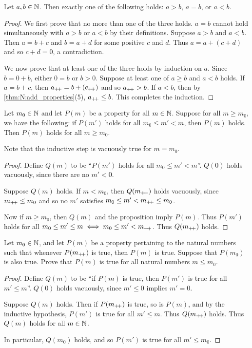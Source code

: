 \begin{proposition}[Trichotomy] \label{thm:trichotomy}
    Let $a, b \in \mathbb{N}$.
    Then exactly one of the following holds: $a > b$, $a = b$, or $a < b$.
\end{proposition}
\begin{proof}
    We first prove that no more than one of the three holds.
    $a = b$ cannot hold simultaneously with $a > b$ or $a < b$ by their
    definitions.
    Suppose $a > b$ and $a < b$.
    Then $a = b + c$ and $b = a + d$ for some positive $c$ and $d$.
    Thus $a = a + (c + d)$ and so $c + d = 0$, a contradiction.

    We now prove that at least one of the three holds by induction on $a$.
    Since $b = 0 + b$, either $0 = b$ or $b > 0$.
    Suppose at least one of $a \ge b$ and $a < b$ holds.
    If $a = b + c$, then $a_{+\!+} = b + (c_{+\!+})$ and so $a_{+\!+} > b$.
    If $a < b$, then by \cref{thm:N:add_properties}(5), $a_{+\!+} \le b$.
    This completes the induction.
\end{proof}

\begin{proposition*} \label{thm:strong_induction}
    Let $m_0 \in \mathbb{N}$ and let $P(m)$ be a property for all $m \in \mathbb{N}$.
    Suppose for all $m \ge m_0$, we have the following:
    if $P(m')$ holds for all $m_0 \le m' < m$, then $P(m)$ holds.
    Then $P(m)$ holds for all $m \ge m_0$.
\end{proposition*}
Note that the inductive step is vacuously true for $m = m_0$.
\begin{proof}
    Define $Q(m)$ to be ``$P(m')$ holds for all $m_0 \le m' < m$''.
    $Q(0)$ holds vacuously, since there are no $m' < 0$.

    Suppose $Q(m)$ holds.
    If $m < m_0$, then $Q(m_{+\!+})$ holds vacuously, since $m_{+\!+} \le m_0$ and so
    no $m'$ satisfies $m_0 \le m' < m_{+\!+} \le m_0$.

    Now if $m \ge m_0$, then $Q(m)$ and the proposition imply $P(m)$.
    Thus $P(m')$ holds for all $m_0 \le m' \le m \iff m_0 \le m' < m_{+\!+}$.
    Thus $Q(m_{+\!+})$ holds.
\end{proof}

\begin{exercise*} \label{prb:back_induction}
    Let $m_0 \in \mathbb{N}$, and let $P(m)$ be a property pertaining to the natural
    numbers such that whenever $P(m_{+\!+})$ is true, then $P(m)$ is true.
    Suppose that $P(m_0)$ is also true.
    Prove that $P(m)$ is true for all natural numbers $m \le m_0$.
\end{exercise*}
\begin{proof}
    Define $Q(m)$ to be ``if $P(m)$ is true, then $P(m')$ is true for all
    $m' \le m$''.
    $Q(0)$ holds vacuously, since $m' \le 0$ implies $m' = 0$.

    Suppose $Q(m)$ holds.
    Then if $P(m_{+\!+})$ is true, so is $P(m)$, and by the inductive hypothesis,
    $P(m')$ is true for all $m' \le m$.
    Thus $Q(m_{+\!+})$ holds.
    Thus $Q(m)$ holds for all $m \in \mathbb{N}$.

    In particular, $Q(m_0)$ holds, and so $P(m')$ is true for all $m' \le m_0$.
\end{proof}

